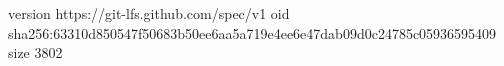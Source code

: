 version https://git-lfs.github.com/spec/v1
oid sha256:63310d850547f50683b50ee6aa5a719e4ee6e47dab09d0c24785c05936595409
size 3802

